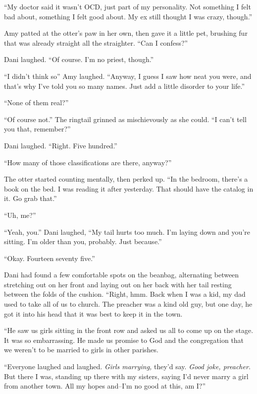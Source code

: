 ``My doctor said it wasn't OCD, just part of my personality. Not something I felt bad about, something I felt good about. My ex still thought I was crazy, though.''

Amy patted at the otter's paw in her own, then gave it a little pet, brushing fur that was already straight all the straighter. ``Can I confess?''

Dani laughed. ``Of course. I'm no priest, though.''

``I didn't think so'' Amy laughed. ``Anyway, I guess I saw how neat you were, and that's why I've told you so many names. Just add a little disorder to your life.''

``None of them real?''

``Of course not.'' The ringtail grinned as mischievously as she could. ``I can't tell you that, remember?''

Dani laughed. ``Right. Five hundred.''

``How many of those classifications are there, anyway?''

The otter started counting mentally, then perked up. ``In the bedroom, there's a book on the bed. I was reading it after yesterday. That should have the catalog in it. Go grab that.''

``Uh, me?''

``Yeah, you.'' Dani laughed, ``My tail hurts too much. I'm laying down and you're sitting. I'm older than you, probably. Just because.''

\secdiv{}

\noindent ``Okay. Fourteen seventy five.''

Dani had found a few comfortable spots on the beanbag, alternating between stretching out on her front and laying out on her back with her tail resting between the folds of the cushion. ``Right, hmm. Back when I was a kid, my dad used to take all of us to church. The preacher was a kind old guy, but one day, he got it into his head that it was best to keep it in the town.

``He saw us girls sitting in the front row and asked us all to come up on the stage. It was so embarrassing. He made us promise to God and the congregation that we weren't to be married to girls in other parishes.

``Everyone laughed and laughed. \emph{Girls marrying,} they'd say. \emph{Good joke, preacher.} But there I was, standing up there with my sisters, saying I'd never marry a girl from another town. All my hopes and--I'm no good at this, am I?''

